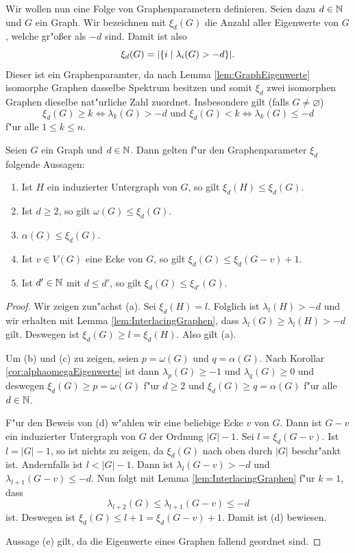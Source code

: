 Wir wollen nun eine Folge von Graphenparametern definieren. Seien dazu $d\in{\mathbb{N}}$ und $G$ ein Graph. Wir bezeichnen mit $\xi_{d}(G)$ die Anzahl aller Eigenwerte von $G$, welche gr"o{\ss}er als $-d$ sind. Damit ist also 
$$\xi_{d}(G) = |\{i \;|\; \lambda_i(G) > -d \}|.$$ 
Dieser ist ein Graphenparamter, da nach Lemma \ref{lem:GraphEigenwerte} isomorphe Graphen dasselbe Spektrum besitzen und somit $\xi_d $ zwei isomorphen Graphen dieselbe nat"urliche Zahl zuordnet. 
Insbesondere gilt (falls $G\neq \varnothing$)
$$\xi_{d}(G) \geq k \Leftrightarrow \lambda_{k}(G) > -d \text{ und } \xi_{d}(G) < k \Leftrightarrow \lambda_{k}(G) \leq -d $$ f"ur alle $1 \leq k \leq n$.

\begin{lemma}
  Seien $G$ ein Graph und $d\in {\mathbb{N}}$. Dann gelten f"ur den Graphenparameter $\xi_d$ folgende Aussagen:
  \begin{enumerate}[label={\rm(\alph*)}]
    \item Ist $H$ ein induzierter Untergraph von $G$, so gilt $\xi_{d}(H) \leq \xi_{d}(G)$.
    \item Ist $d\geq 2$, so gilt $\omega(G) \leq \xi_{d}(G)$.
    \item $\alpha(G) \leq \xi_{d}(G)$. 
    \item Ist $v\in V(G)$ eine Ecke von $G$, so gilt $\xi_{d}(G) \leq \xi_{d}(G-v) +1$.
    \item Ist $d'\in{\mathbb{N}}$ mit $d \leq d'$, so gilt $\xi_{d}(G) \leq \xi_{d'}(G)$.
  \end{enumerate}
  \label{lem:xieigenschaften}
\end{lemma}

\begin{proof}
  Wir zeigen zun"achst (a). Sei $\xi_{d}(H) = l$. Folglich ist $\lambda_{l}(H) > -d$ und wir erhalten mit Lemma \ref{lem:InterlacingGraphen}, dass $\lambda_{l}(G) \geq \lambda_{l}(H) > -d$ gilt. Deswegen ist $\xi_{d}(G) \geq l = \xi_{d}(H)$. Also gilt (a).

  Um (b) und (c) zu zeigen, seien $p = \omega(G)$ und $q=\alpha(G)$. Nach Korollar \ref{cor:alphaomegaEigenwerte} ist dann $\lambda_{p}(G) \geq -1$ und $\lambda_q(G) \geq 0$ und deswegen $\xi_{d}(G) \geq p = \omega(G)$ f"ur $d \geq 2$ und $\xi_{d}(G) \geq q = \alpha(G)$ f"ur alle $d \in {\mathbb{N}}$. 

  F"ur den Beweis von (d) w"ahlen wir eine beliebige Ecke $v$ von $G$. Dann ist $G-v$ ein induzierter Untergraph von $G$ der Ordnung $|G|-1$. Sei $l=\xi_{d}(G-v)$. Ist $l= |G|-1$, so ist nichts zu zeigen, da $\xi_d(G)$ nach oben durch $|G|$ beschr"ankt ist. Andernfalls ist $l< |G| -1$. 
  Dann ist $\lambda_{l}(G-v) > -d$ und $\lambda_{l+1}(G-v) \leq -d$. Nun folgt mit Lemma \ref{lem:InterlacingGraphen} f"ur $k=1$, dass $$\lambda_{l+2}(G) \leq \lambda_{l+1}(G-v) \leq -d$$ ist. Deswegen ist $\xi_{d}(G) \leq l+1 = \xi_{d}(G-v) +1$. Damit ist (d) bewiesen.

  Aussage (e) gilt, da die Eigenwerte eines Graphen fallend geordnet sind.
\end{proof}

